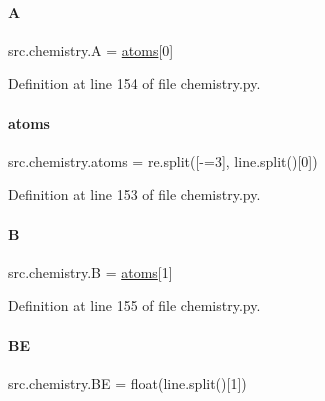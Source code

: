 \paragraph{\texorpdfstring{A}{A}}
{\footnotesize\ttfamily src.\+chemistry.\+A = \hyperlink{namespacesrc_1_1chemistry_a92d33a1aa706dcfde71fed97568964de}{atoms}\mbox{[}0\mbox{]}}



Definition at line 154 of file chemistry.\+py.

\mbox{\label{namespacesrc_1_1chemistry_a92d33a1aa706dcfde71fed97568964de}} 
\paragraph{\texorpdfstring{atoms}{atoms}}
{\footnotesize\ttfamily src.\+chemistry.\+atoms = re.\+split(\textquotesingle{}\mbox{[}-\/=3\mbox{]}\textquotesingle{}, line.\+split()\mbox{[}0\mbox{]})}



Definition at line 153 of file chemistry.\+py.

\mbox{\label{namespacesrc_1_1chemistry_a43668732826c79b3179214cf463b5d70}} 
\paragraph{\texorpdfstring{B}{B}}
{\footnotesize\ttfamily src.\+chemistry.\+B = \hyperlink{namespacesrc_1_1chemistry_a92d33a1aa706dcfde71fed97568964de}{atoms}\mbox{[}1\mbox{]}}



Definition at line 155 of file chemistry.\+py.

\mbox{\label{namespacesrc_1_1chemistry_a4ceca7d8e543e8866c0ad95b5a967551}} 
\paragraph{\texorpdfstring{BE}{BE}}
{\footnotesize\ttfamily src.\+chemistry.\+BE = float(line.\+split()\mbox{[}1\mbox{]})}



